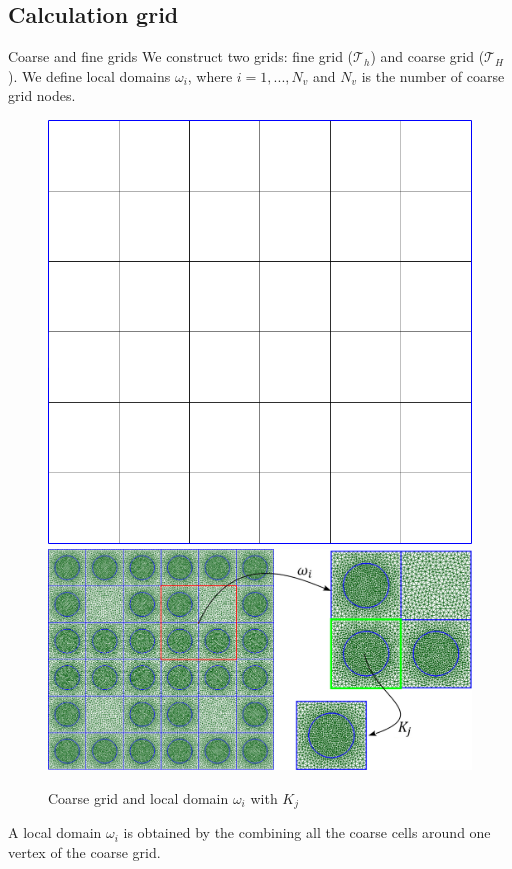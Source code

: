 \documentclass[10pt,pdf,hyperref={unicode}]{beamer}
\begin{document}
\subsection{Calculation grid}
	\begin{frame}{Coarse and fine grids}
		We construct two grids: fine grid ($\mathcal{T}_h$) and coarse grid ($\mathcal{T}_H$). 
		We define local domains $\omega_i$, where $i = 1,...,N_v$ and $N_v$ is the number of coarse grid nodes.

		\begin{figure}[h]
			\centering
				\includegraphics[width=0.26\linewidth]{coarse_grid.png}
				\hspace{2em}
				\includegraphics[width=0.5\linewidth]{omega.png} 
			\caption{Coarse grid and local domain $\omega_i$ with $K_j$}
		\end{figure} 

		A local domain $\omega_i$ is obtained by the combining all the coarse cells around one vertex of the coarse grid. 
	\end{frame}
\end{document}
